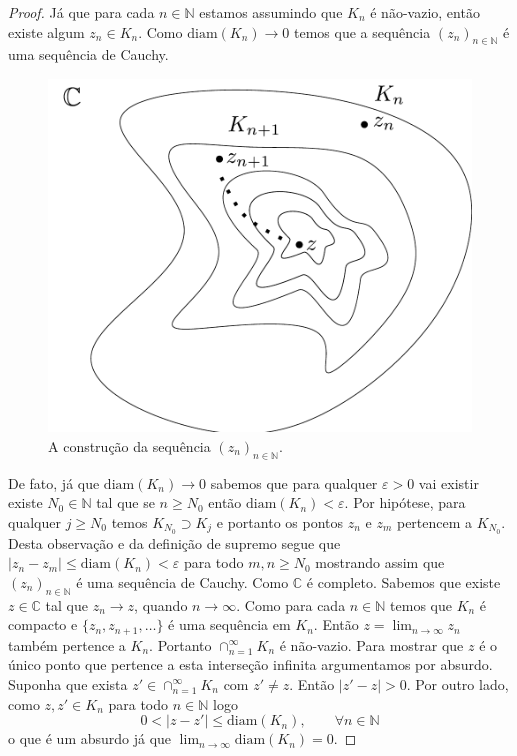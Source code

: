 \begin{proof}
Já que para cada $n\in\mathbb{N}$ estamos assumindo que $K_n$ é não-vazio, então existe algum
$z_n\in K_n$. Como $\mathrm{diam}(K_n)\to 0$ temos que a sequência $(z_n)_{n\in\mathbb{N}}$
é uma sequência de Cauchy. 

\begin{figure}[h]
\centering
\includegraphics[scale=0.6]{Figuras/teorema-cantor}
\caption{A construção da sequência $(z_n)_{n\in\mathbb{N}}$.}
\label{fig:teorema-cantor}
\end{figure}


De fato, já que $\mathrm{diam}(K_n)\to 0$ sabemos que para qualquer $\varepsilon>0$ vai existir existe $N_0\in\mathbb{N}$ tal que se $n\geqslant N_0$ então 
$\mathrm{diam}(K_n)<\varepsilon$. Por hipótese, 
para qualquer $j\geqslant N_{0}$ temos $K_{N_0}\supset K_{j}$
e portanto os pontos $z_n$ e $z_{m}$ pertencem a $K_{N_0}$. 
Desta observação e da definição de supremo segue
que $|z_n-z_m|\leq \mathrm{diam}(K_n)<\varepsilon$
para todo $m,n\geqslant N_0$ mostrando assim que $(z_n)_{n\in\mathbb{N}}$
é uma sequência de Cauchy. Como $\mathbb{C}$ é completo. Sabemos que existe $z\in\mathbb{C}$
tal que $z_n\to z$, quando $n\to\infty$. Como para cada $n\in\mathbb{N}$ temos que $K_n$ é compacto e $\{z_n,z_{n+1},\ldots\}$
é uma sequência em $K_n$. Então $z=\lim_{n\to\infty} z_n$ também pertence a $K_n$.
Portanto $\cap_{n=1}^{\infty}K_n$ é não-vazio. Para mostrar que $z$ é o único ponto 
que pertence a esta interseção infinita argumentamos por absurdo. Suponha que exista $z'\in \cap_{n=1}^{\infty}K_n$ com $z'\neq z$. Então $|z'-z|>0$. Por outro lado, como $z,z'\in K_n$ 
para todo $n\in\mathbb{N}$ logo
\[
0<|z-z'|\leqslant \mathrm{diam}(K_n), \qquad \forall n\in\mathbb{N}
\]
o que é um absurdo já que $\lim_{n\to\infty}\mathrm{diam}(K_n)=0$.
\end{proof}

